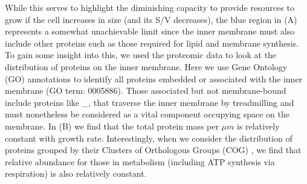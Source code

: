 While this serves to highlight the diminishing capacity to provide resources to
grow if the cell increases in size (and its S/V decreases), the blue region in
(A) represents a somewhat unachievable limit since the inner
membrane must also include other proteins such as those required for lipid and
membrane synthesis. To gain some insight into this, we used the proteomic data
to look at the distribution of proteins on the inner membrane. Here we use Gene
Ontology (GO) annotations \citep{ashburner2000,thegeneOntologyconsortium2018} to
identify all proteins embedded or associated with the inner membrane (GO term:
0005886). Those associated but not membrane-bound include proteins like _, that
traverse the inner membrane by treadmilling and must nonetheless be considered
as a vital component occupying space on the membrane. In (B)
we find that the total protein mass per $\mu m$ is relatively constant with
growth rate. Interestingly, when we consider the distribution of proteins
grouped by their Clusters of Orthologous Groups (COG) \citep{tatusov2000}, we
find that relative abundance for those in metabolism (including ATP synthesis
via respiration) is also relatively constant.







\begin{figure}
    \begin{fullwidth}
    \end{fullwidth}
\end{figure}
